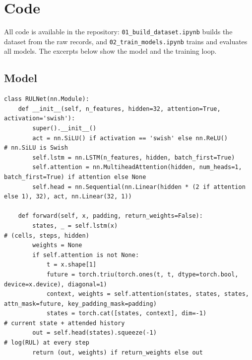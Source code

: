 \documentclass[conference]{IEEEtran}
\begin{document}
\clearpage
\section{Code}
All code is available in the repository: \texttt{01\_build\_dataset.ipynb} builds the dataset from the raw records, and \texttt{02\_train\_models.ipynb} trains and evaluates all models. The excerpts below show the model and the training loop.

\subsection{Model}
\begin{lstlisting}
class RULNet(nn.Module):
    def __init__(self, n_features, hidden=32, attention=True, activation='swish'):
        super().__init__()
        act = nn.SiLU() if activation == 'swish' else nn.ReLU()            # nn.SiLU is Swish
        self.lstm = nn.LSTM(n_features, hidden, batch_first=True)
        self.attention = nn.MultiheadAttention(hidden, num_heads=1, batch_first=True) if attention else None
        self.head = nn.Sequential(nn.Linear(hidden * (2 if attention else 1), 32), act, nn.Linear(32, 1))

    def forward(self, x, padding, return_weights=False):
        states, _ = self.lstm(x)                                           # (cells, steps, hidden)
        weights = None
        if self.attention is not None:
            t = x.shape[1]
            future = torch.triu(torch.ones(t, t, dtype=torch.bool, device=x.device), diagonal=1)
            context, weights = self.attention(states, states, states, attn_mask=future, key_padding_mask=padding)
            states = torch.cat([states, context], dim=-1)                  # current state + attended history
        out = self.head(states).squeeze(-1)                                # log(RUL) at every step
        return (out, weights) if return_weights else out
\end{lstlisting}
\end{document}
